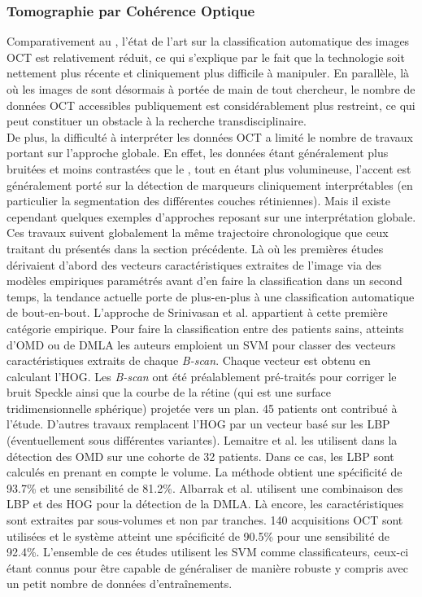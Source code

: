\subsubsection{Tomographie par Cohérence Optique}
Comparativement au \fundus{}, l'état de l'art sur la classification automatique des images \ac{OCT} est relativement réduit, ce qui s'explique par le fait que la technologie soit nettement plus récente et cliniquement plus difficile à manipuler. En parallèle, là où les images de \fundus{} sont désormais à portée de main de tout chercheur, le nombre de données \ac{OCT} accessibles publiquement est considérablement plus restreint, ce qui peut constituer un obstacle à la recherche transdisciplinaire.
\\
De plus, la difficulté à interpréter les données \ac{OCT} a limité le nombre de travaux portant sur l'approche globale. En effet, les données étant généralement plus bruitées et moins contrastées que le \fundus{}, tout en étant plus volumineuse, l'accent est généralement porté sur la détection de marqueurs cliniquement interprétables (en particulier la segmentation des différentes couches rétiniennes).
Mais il existe cependant quelques exemples d'approches reposant sur une interprétation globale. Ces travaux suivent globalement la même trajectoire chronologique que ceux traitant du \fundus{} présentés dans la section précédente. Là où les premières études dérivaient d'abord des vecteurs caractéristiques extraites de l'image via des modèles empiriques paramétrés avant d'en faire la classification dans un second temps, la tendance actuelle porte de plus-en-plus à une classification automatique de bout-en-bout.
L'approche de Srinivasan et al.\cite{srinivasanFullyAutomatedDetection2014} appartient à cette première catégorie empirique. Pour faire la classification entre des patients sains, atteints d'\ac{OMD} ou de \ac{DMLA} les auteurs emploient un \ac{SVM} pour classer des vecteurs caractéristiques extraits de chaque \textit{B-scan}. Chaque vecteur est obtenu en calculant l'\ac{HOG}. Les \textit{B-scan} ont été préalablement pré-traités pour corriger le bruit Speckle ainsi que la courbe de la rétine (qui est une surface tridimensionnelle sphérique) projetée vers un plan. 45 patients ont contribué à l'étude. D'autres travaux remplacent l'\ac{HOG} par un vecteur basé sur les \ac{LBP} (éventuellement sous différentes variantes). Lemaitre et al.\cite{lemaitreClassificationSDOCTVolumes2016} les utilisent dans la détection des \ac{OMD} sur une cohorte de 32 patients. Dans ce cas, les \ac{LBP} sont calculés en prenant en compte le volume. La méthode obtient une spécificité de 93.7\% et une sensibilité de 81.2\%. Albarrak et al.\cite{albarrakAgerelatedMacularDegeneration} utilisent une combinaison des \ac{LBP} et des \ac{HOG} pour la détection de la \ac{DMLA}. Là encore, les caractéristiques sont extraites par sous-volumes et non par tranches. 140 acquisitions \ac{OCT} sont utilisées et le système atteint une spécificité de 90.5\% pour une sensibilité de 92.4\%. L'ensemble de ces études utilisent les \ac{SVM} comme classificateurs, ceux-ci étant connus pour être capable de généraliser de manière robuste y compris avec un petit nombre de données d'entraînements. 
